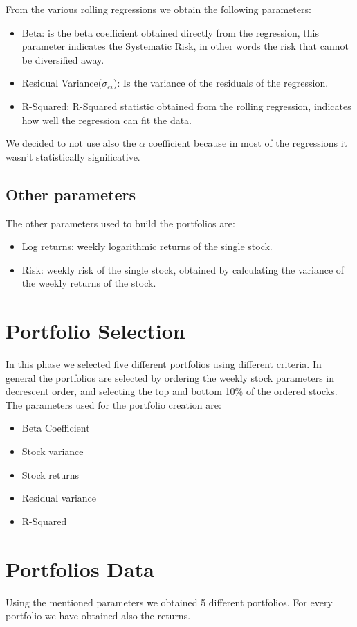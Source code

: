 \documentclass[12pt, a4paper, twocolumn]{article} %
\begin{document}
	From the various rolling regressions we obtain the following parameters:
	\begin{itemize}
		\item Beta: is the beta coefficient obtained directly from the regression, this parameter indicates the Systematic Risk, in other words the risk that cannot be diversified away.
		\item Residual Variance($\sigma_{ei}$): Is the variance of the residuals of the regression.
		\item R-Squared: R-Squared statistic obtained from the rolling regression, indicates how well the regression can fit the data.
	\end{itemize}
	We decided to not use also the $\alpha$ coefficient because in most of the regressions it wasn't statistically significative.
	\subsection{Other parameters}
	The other parameters used to build the portfolios are:
	\begin{itemize}
		\item Log returns: weekly logarithmic returns of the single stock.
		\item Risk: weekly risk of the single stock, obtained by calculating the variance of the weekly returns of the stock.
	\end{itemize}
	
	\section{Portfolio Selection}
	In this phase we selected five different portfolios using different criteria. In general the portfolios are selected by ordering the weekly stock parameters in decrescent order, and selecting the top and bottom 10\% of the ordered stocks.
	The parameters used for the portfolio creation are:
	\begin{itemize}
		\item Beta Coefficient
		\item Stock variance
		\item Stock returns
		\item Residual variance
		\item R-Squared
	\end{itemize}
	\section{Portfolios Data}
	Using the mentioned parameters we obtained 5 different portfolios. For every portfolio we have obtained also the returns.
\end{document}
